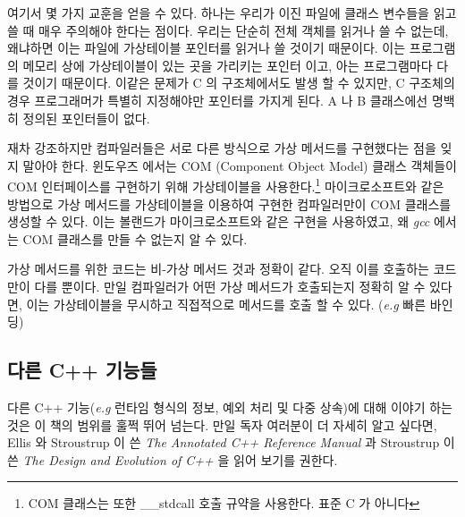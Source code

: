 
여기서 몇 가지 교훈을 얻을 수 있다. 하나는 우리가 이진 파일에
클래스 변수들을 읽고 쓸 때 매우 주의해야 한다는 점이다. 우리는 단순히 전체 객체를 읽거나
쓸 수 없는데, 왜냐하면 이는 파일에 가상테이블 포인터를 읽거나 쓸 것이기 때문이다.
이는 프로그램의 메모리 상에 가상테이블이 있는 곳을 가리키는 포인터 이고, 아는 프로그램마다
다를 것이기 때문이다. 이같은 문제가 C 의 구조체에서도 발생 할 수 있지만, C 구조체의 경우
프로그래머가 특별히 지정해야만 포인터를 가지게 된다. {\code A} 나 {\code B} 클래스에선
명백히 정의된 포인터들이 없다. 

재차 강조하지만 컴파일러들은 서로 다른 방식으로 가상 메서드를 구현했다는 점을
잊지 말아야 한다. 윈도우즈 에서는 COM (Component Object Model)  
클래스 객체들이 COM 인터페이스를 구현하기 위해 가상테이블을 사용한다.\footnote{
COM 클래스는 또한 {\code \_\_stdcall}  호출 규약을 사용한다.
표준 C 가 아니다} 마이크로소프트와 같은 방법으로 가상 메서드를 가상테이블을 이용하여 구현한 컴파일러만이 
COM 클래스를 생성할 수 있다. 이는 볼랜드가 마이크로소프트와 같은 구현을 사용하였고,
왜 \emph{gcc} 에서는 COM 클래스를 만들 수 없는지 알 수 있다. 

가상 메서드를 위한 코드는 비-가상 메서드 것과 정확이 같다. 오직 이를 호출하는
코드만이 다를 뿐이다. 만일 컴파일러가 어떤 가상 메서드가 호출되는지 정확히 알 수 있다면,
이는 가상테이블을 무시하고 직접적으로 메서드를 호출 할 수 있다. (\emph{e.g} 빠른 바인딩)


\subsection{다른 C++ 기능들}

다른 C++ 기능(\emph{e.g} 런타임 형식의 정보, 예외 처리 및 다중 상속)에 대해 이야기 하는 것은
이 책의 범위를 훌쩍 뛰어 넘는다. 만일 독자 여러분이 더 자세히 알고 싶다면,
Ellis 와 Stroustrup 이 쓴 \emph{The Annotated C++ Reference Manual} 과 
Stroustrup 이 쓴 \emph{The Design and Evolution of C++} 을 읽어 보기를 권한다. 
